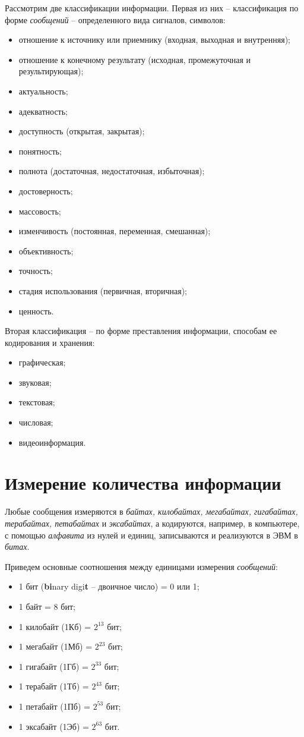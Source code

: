 Рассмотрим две классификации информации. Первая из них -- классификация по форме \emph{сообщений} -- определенного вида сигналов, символов:
\begin{itemize}
  \item отношение к источнику или приемнику (входная, выходная и внутренняя);
  \item отношение к конечному результату (исходная, промежуточная и результирующая);
  \item актуальность;
  \item адекватность;
  \item доступность (открытая, закрытая);
  \item понятность;
  \item полнота (достаточная, недостаточная, избыточная);
  \item достоверность;
  \item массовость;
  \item изменчивость (постоянная, переменная, смешанная);
  \item объективность;
  \item точность;
  \item стадия использования (первичная, вторичная);
  \item ценность.
\end{itemize}

Вторая классификация -- по форме преставления информации, способам ее кодирования и хранения:
\begin{itemize}
  \item графическая;
  \item звуковая;
  \item текстовая;
  \item числовая;
  \item видеоинформация.
\end{itemize}

\section{Измерение количества информации}
Любые сообщения измеряются в \emph{байтах, килобайтах, мегабайтах, гигабайтах, терабайтах, петабайтах} и \emph{эксабайтах}, а кодируются, например, в компьютере, с помощью \emph{алфавита} из нулей и единиц, записываются и реализуются в ЭВМ в \emph{битах}.

Приведем основные соотношения между единицами измерения \emph{сообщений}:
\begin{itemize}
\item 1 бит (\textbf{bi}nary digi\textbf{t} -- двоичное число) = 0 или 1;
\item 1 байт = 8 бит;
\item 1 килобайт (1Кб) = $2^{13}$ бит;
\item 1 мегабайт (1Мб) = $2^{23}$ бит;
\item 1 гигабайт (1Гб) = $2^{33}$ бит;
\item 1 терабайт (1Тб) = $2^{43}$ бит;
\item 1 петабайт (1Пб) = $2^{53}$ бит;
\item 1 эксабайт (1Эб) = $2^{63}$ бит.
\end{itemize}

